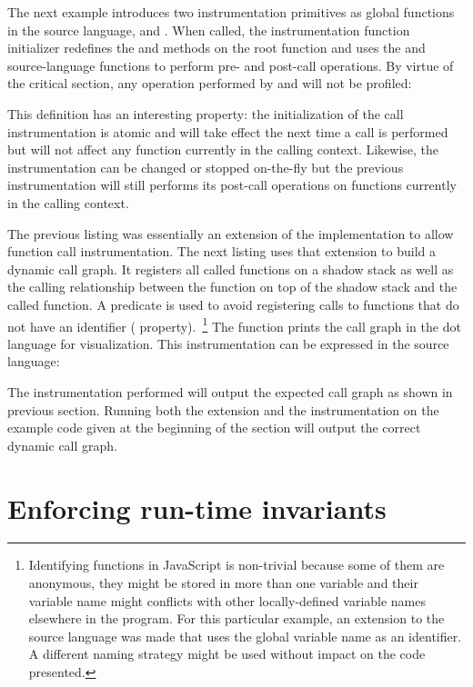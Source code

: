 The next example introduces two instrumentation primitives as global functions
in the source language,  and
. When called, the instrumentation function
initializer redefines the  and  methods on the root function
and uses the  and  source-language functions to perform
pre- and post-call operations.  By virtue of the critical section, any operation
performed by  and  will not be profiled:


This definition has an interesting property: the initialization of the call
instrumentation is atomic and will take effect the next time a call is
performed but will not affect any function currently in the calling context.
Likewise, the instrumentation can be changed or stopped on-the-fly but the
previous instrumentation will still performs its post-call operations on
functions currently in the calling context.

The previous listing was essentially an extension of the implementation to
allow function call instrumentation. The next listing uses that extension to
build a dynamic call graph. It registers all called functions on a shadow stack
as well as the calling relationship between the function on top of the shadow
stack and the called function. A predicate is used to avoid registering calls
to functions that do not have an identifier (
property).~\footnote{Identifying functions in JavaScript is non-trivial because
some of them are anonymous, they might be stored in more than one variable and
their variable name might conflicts with other locally-defined variable names
elsewhere in the program. For this particular example, an extension to the
source language was made that uses the global variable name as an identifier. A
different naming strategy might be used without impact on the code presented.}
The  function prints the call graph in the dot language for
visualization. This instrumentation can be expressed in the source language:


The instrumentation performed will output the expected call graph as shown in
previous section. Running both the extension and the instrumentation on the
example code given at the beginning of the section will output the correct
dynamic call graph.

\section{Enforcing run-time invariants}

